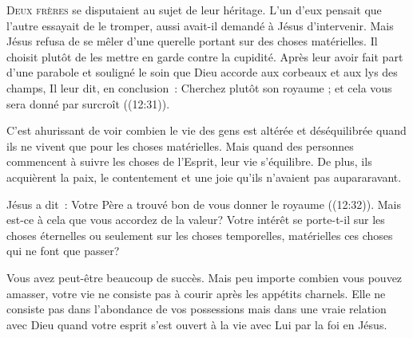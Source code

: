 

\lettrine{D}{eux frères} se disputaient au sujet de leur héritage.
 L'un d'eux pensait que l'autre essayait de le tromper,
 aussi avait-il demandé à Jésus d'intervenir.
 Mais Jésus refusa de se mêler d'une querelle portant
 sur des choses matérielles. Il choisit plutôt de les mettre en garde
 contre la cupidité. Après leur avoir fait part d'une parabole
 et souligné le soin que Dieu accorde aux corbeaux et aux lys des champs,
 Il leur dit, en conclusion~: 
 \og Cherchez plutôt son royaume ; et cela vous sera donné par surcroît \fg{}
 ((12:31)). 


C'est ahurissant de voir combien le vie des gens est altérée
 et déséquilibrée quand ils ne vivent que pour les choses matérielles.
 Mais quand des personnes commencent à suivre les choses de l'Esprit,
 leur vie s'équilibre. De plus, ils acquièrent la paix,
 le contentement et une joie qu'ils n'avaient pas aupararavant.

Jésus a dit~: 
 \og Votre Père a trouvé bon de vous donner le royaume \fg{}
 ((12:32)). Mais est-ce à cela que vous accordez
 de la valeur? Votre intérêt se porte-t-il sur les choses éternelles
 ou seulement sur les choses temporelles, matérielles
 \ocadr ces choses qui ne font que passer?

Vous avez peut-être beaucoup de succès. Mais peu importe combien
 vous pouvez amasser, votre vie ne consiste pas à courir après
 les appétits charnels. Elle ne consiste pas dans l'abondance
 de vos possessions mais dans une vraie relation avec Dieu
 quand votre esprit s'est ouvert à la vie avec Lui par la foi en Jésus.

\dvrule





